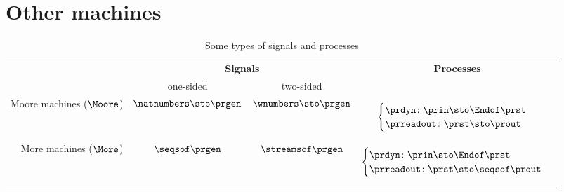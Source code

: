 \section{Other machines}

\begin{table*}[b]
    \caption{Some types of signals and processes}
    \label{tab:processes-types}
    \begin{tabular}{rccc}
                                                     & \multicolumn{2}{c}{\textbf{Signals}}      & \textbf{Processes} \\
                                                     & \rule{0pt}{10pt} one-sided                & two-sided            & \\
        Moore machines ($\Moore$)                    &
        $\natnumbers \sto \prgen$
                                                     &
        $\wnumbers \sto \prgen$
                                                     &
        \begin{minipage}{4cm}
            \raggedright
            \begin{equation*}
                \begin{cases}
                    \prdyn \colon \prin \sto \Endof \prst \\
                    \prreadout \colon \prst \sto \prout
                \end{cases}
            \end{equation*}
        \end{minipage} \\

        More machines ($\More$)                      & $\seqsof \prgen$                          & $\streamsof \prgen$
                                                     &
        \begin{minipage}{4cm}
            \raggedright
            \begin{equation*}
                \begin{cases}
                    \prdyn \colon   \prin \sto \Endof \prst \\
                    \prreadout \colon \prst \sto \seqsof \prout
                \end{cases}
            \end{equation*}


\end{minipage}
\end{tabular}
\end{table*}
